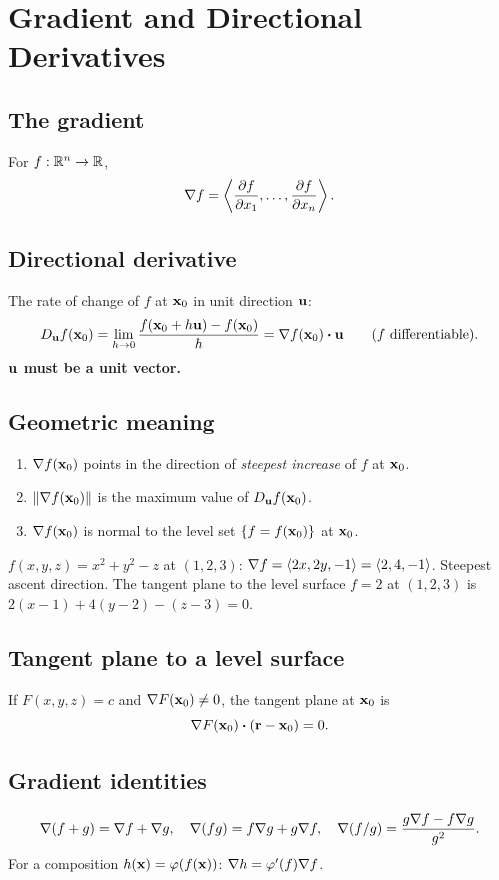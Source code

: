 \section{Gradient and Directional Derivatives}

\subsection{The gradient}
For $f : \mathbb{R}^n \to \mathbb{R}$,
\[ \nabla f = \left\langle \frac{\partial f}{\partial x_1}, \ldots, \frac{\partial f}{\partial x_n} \right\rangle. \]

\subsection{Directional derivative}
The rate of change of $f$ at $\mathbf{x}_0$ in unit direction $\mathbf{u}$:
\[ D_{\mathbf{u}} f(\mathbf{x}_0) = \lim_{h \to 0} \frac{f(\mathbf{x}_0 + h \mathbf{u}) - f(\mathbf{x}_0)}{h}
= \nabla f(\mathbf{x}_0) \boldsymbol\cdot \mathbf{u} \qquad \text{($f$ differentiable)}. \]
\textbf{$\mathbf{u}$ must be a unit vector.}

\subsection{Geometric meaning}
\begin{keybox}
\begin{enumerate}[leftmargin=*,nosep]
  \item $\nabla f(\mathbf{x}_0)$ points in the direction of \emph{steepest increase} of $f$ at $\mathbf{x}_0$.
  \item $\lVert \nabla f(\mathbf{x}_0) \rVert$ is the maximum value of $D_{\mathbf{u}} f(\mathbf{x}_0)$.
  \item $\nabla f(\mathbf{x}_0)$ is normal to the level set $\{ f = f(\mathbf{x}_0) \}$ at $\mathbf{x}_0$.
\end{enumerate}
\end{keybox}

\begin{example}
$f(x,y,z) = x^2 + y^2 - z$ at $(1,2,3)$: $\nabla f = \langle 2x, 2y, -1 \rangle = \langle 2,4,-1\rangle$.
Steepest ascent direction. The tangent plane to the level surface $f = 2$ at $(1,2,3)$ is
$2(x-1) + 4(y-2) - (z-3) = 0$.
\end{example}

\subsection{Tangent plane to a level surface}
If $F(x,y,z) = c$ and $\nabla F(\mathbf{x}_0) \neq 0$, the tangent plane at $\mathbf{x}_0$ is
\[ \nabla F(\mathbf{x}_0) \boldsymbol\cdot (\mathbf{r} - \mathbf{x}_0) = 0. \]

\subsection{Gradient identities}
\[
\nabla (f + g) = \nabla f + \nabla g, \quad
\nabla (f g) = f \nabla g + g \nabla f, \quad
\nabla (f/g) = \frac{g \nabla f - f \nabla g}{g^2}.
\]
For a composition $h(\mathbf{x}) = \varphi(f(\mathbf{x}))$: $\nabla h = \varphi'(f) \nabla f$.
